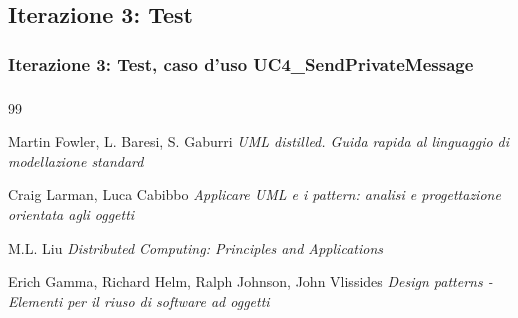 \documentclass[t]{beamer} %
\begin{document}
\subsection{Iterazione 3: Test}
\begin{frame}
  \frametitle{Iterazione 3: Test, caso d'uso UC4\_SendPrivateMessage}
\end{frame}

\begin {frame} 
 \frametitle {\refname}
  \begin {thebibliography}{99}
   {\tiny 
       Martin Fowler, L. Baresi, S. Gaburri 
     \newblock \emph{UML distilled. Guida rapida al linguaggio di modellazione standard} 

      Craig Larman, Luca Cabibbo
     \newblock \emph{Applicare UML e i pattern: analisi e progettazione orientata agli oggetti} 

      M.L. Liu
     \newblock \emph{Distributed Computing: Principles and Applications} 

      Erich Gamma, Richard Helm, Ralph Johnson, John Vlissides
     \newblock \emph{Design patterns - Elementi per il riuso di software ad oggetti} 
   }
   \end {thebibliography}
\end {frame}
\end{document}
